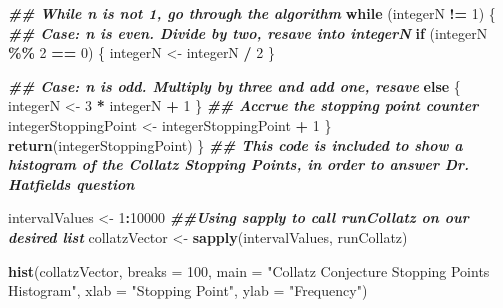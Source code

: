 \documentclass[
]{article}
\newenvironment{Shaded}{\begin{snugshade}}{\end{snugshade}}
\newcommand{\AttributeTok}[1]{\textcolor[rgb]{0.13,0.29,0.53}{#1}}
\newcommand{\ControlFlowTok}[1]{\textcolor[rgb]{0.13,0.29,0.53}{\textbf{#1}}}
\newcommand{\DecValTok}[1]{\textcolor[rgb]{0.00,0.00,0.81}{#1}}
\newcommand{\DocumentationTok}[1]{\textcolor[rgb]{0.56,0.35,0.01}{\textbf{\textit{#1}}}}
\newcommand{\FunctionTok}[1]{\textcolor[rgb]{0.13,0.29,0.53}{\textbf{#1}}}
\newcommand{\NormalTok}[1]{#1}
\newcommand{\OtherTok}[1]{\textcolor[rgb]{0.56,0.35,0.01}{#1}}
\newcommand{\SpecialCharTok}[1]{\textcolor[rgb]{0.81,0.36,0.00}{\textbf{#1}}}
\newcommand{\StringTok}[1]{\textcolor[rgb]{0.31,0.60,0.02}{#1}}
\begin{document}
\begin{Shaded}
\begin{Highlighting}[]
  
\DocumentationTok{\#\# While n is not 1, go through the algorithm}
  \ControlFlowTok{while}\NormalTok{ (integerN }\SpecialCharTok{!=} \DecValTok{1}\NormalTok{)                                  }
\NormalTok{    \{}
\DocumentationTok{\#\# Case: n is even. Divide by two, resave into integerN}
      \ControlFlowTok{if}\NormalTok{ (integerN }\SpecialCharTok{\%\%} \DecValTok{2} \SpecialCharTok{==} \DecValTok{0}\NormalTok{)                             }
\NormalTok{      \{}
\NormalTok{        integerN }\OtherTok{\textless{}{-}}\NormalTok{ integerN }\SpecialCharTok{/} \DecValTok{2}
\NormalTok{      \}}
    
\DocumentationTok{\#\# Case: n is odd. Multiply by three and add one, resave}
      \ControlFlowTok{else}                                                
\NormalTok{      \{}
\NormalTok{        integerN }\OtherTok{\textless{}{-}} \DecValTok{3} \SpecialCharTok{*}\NormalTok{ integerN }\SpecialCharTok{+} \DecValTok{1}
\NormalTok{      \}}
\DocumentationTok{\#\# Accrue the stopping point counter}
\NormalTok{    integerStoppingPoint }\OtherTok{\textless{}{-}}\NormalTok{ integerStoppingPoint }\SpecialCharTok{+} \DecValTok{1}      
\NormalTok{    \}}
  \FunctionTok{return}\NormalTok{(integerStoppingPoint)}
\NormalTok{\}}
\DocumentationTok{\#\# This code is included to show a histogram of the Collatz Stopping Points, in order to answer Dr. Hatfield\textquotesingle{}s question}

\NormalTok{intervalValues }\OtherTok{\textless{}{-}} \DecValTok{1}\SpecialCharTok{:}\DecValTok{10000}
\DocumentationTok{\#\#Using sapply to call runCollatz on our desired list}
\NormalTok{collatzVector }\OtherTok{\textless{}{-}} \FunctionTok{sapply}\NormalTok{(intervalValues, runCollatz)}

\FunctionTok{hist}\NormalTok{(collatzVector, }\AttributeTok{breaks =} \DecValTok{100}\NormalTok{, }\AttributeTok{main =} \StringTok{"Collatz Conjecture Stopping Points Histogram"}\NormalTok{, }\AttributeTok{xlab =} \StringTok{"Stopping Point"}\NormalTok{, }\AttributeTok{ylab =} \StringTok{"Frequency"}\NormalTok{)}
\end{Highlighting}
\end{Shaded}
\end{document}
